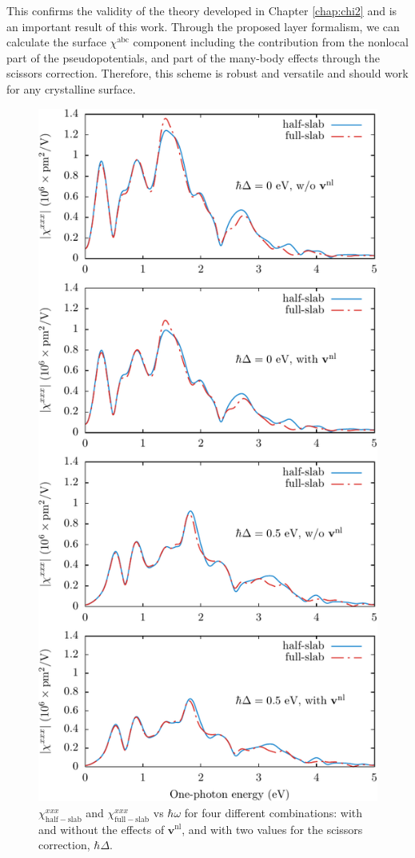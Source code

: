 This confirms the validity of the theory developed in Chapter \ref{chap:chi2}
and is an important result of this work. Through the proposed layer formalism,
we can calculate the surface $\chi^{\mathrm{abc}}$ component including the
contribution from the nonlocal part of the pseudopotentials, and part of the
many-body effects through the scissors correction. Therefore, this scheme is
robust and versatile and should work for any crystalline surface.

\clearpage
\begin{figure}[H]
\centering 
\includegraphics[height=0.9\textheight]{content/figures/fig-Si2x1-hsvsfs}
\caption{$\chi^{xxx}_{\mathrm{half-slab}}$ and $\chi^{xxx}_{\mathrm{full-slab}}$
vs $\hbar\omega$ for four different combinations: with and without the effects
of $\mathbf{v}^\mathrm{nl}$, and with two values for the scissors correction,
$\hbar\Delta$.}
\label{fig:hsvfs}
\end{figure}

